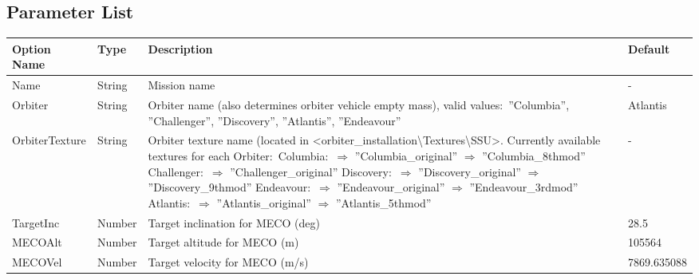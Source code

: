 \documentclass[Space_Shuttle_Ultra_Manual.tex]{subfiles}
\begin{document}
\newpage

\subsection{Parameter List}
  \begin{longtable}{|l|p{1.5cm}|p{7.5cm}|l|}
	\hline
	\rule{0pt}{2ex}
	\textbf{Option Name} & \textbf{Type} & \textbf{Description} & \textbf{Default}\\
	\hline
	\rule{0pt}{2ex}
	Name & String & Mission name & -\\
	\hline
	\rule{0pt}{2ex}
	Orbiter & String & Orbiter name (also determines orbiter vehicle empty mass), valid values$\colon$ ''Columbia'', ''Challenger'', ''Discovery'', ''Atlantis'', ''Endeavour'' & Atlantis\\
	\hline
	\rule{0pt}{2ex}
	OrbiterTexture & String & Orbiter texture name (located in <orbiter\_installation\textbackslash Textures\textbackslash SSU>. Currently available textures for each Orbiter$\colon$ \newline
Columbia$\colon$ \newline
$\Rightarrow$ ''Columbia\_original''\newline
$\Rightarrow$ ''Columbia\_8thmod''\newline
Challenger$\colon$\newline
$\Rightarrow$ ''Challenger\_original''\newline
Discovery$\colon$\newline
$\Rightarrow$ ''Discovery\_original''\newline
$\Rightarrow$ ''Discovery\_9thmod''\newline
Endeavour$\colon$\newline
$\Rightarrow$ ''Endeavour\_original''\newline
$\Rightarrow$ ''Endeavour\_3rdmod''\newline
Atlantis$\colon$\newline
$\Rightarrow$ ''Atlantis\_original''\newline
$\Rightarrow$ ''Atlantis\_5thmod''	& -\\
	\hline
	\rule{0pt}{2ex}
	TargetInc & Number & Target inclination for MECO (deg) & 28.5\\
	\hline
	\rule{0pt}{2ex}
	MECOAlt & Number & Target altitude for MECO (m) & 105564\\
	\hline
	\rule{0pt}{2ex}
	MECOVel & Number & Target velocity for MECO (m/s) & 7869.635088\\

\end{longtable}
\end{document}
